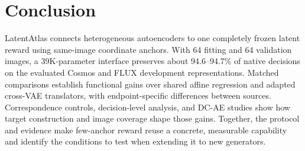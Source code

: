 \documentclass[10pt,twocolumn,letterpaper]{article}
\begin{document}
\section{Conclusion}
LatentAtlas connects heterogeneous autoencoders to one completely frozen latent reward using same-image coordinate anchors. With 64 fitting and 64 validation images, a 39K-parameter interface preserves about 94.6--94.7\% of native decisions on the evaluated Cosmos and FLUX development representations. Matched comparisons establish functional gains over shared affine regression and adapted cross-VAE translators, with endpoint-specific differences between sources. Correspondence controls, decision-level analysis, and DC-AE studies show how target construction and image coverage shape those gains. Together, the protocol and evidence make few-anchor reward reuse a concrete, measurable capability and identify the conditions to test when extending it to new generators.

{\small}
\end{document}
